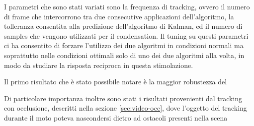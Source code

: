 I parametri che sono stati variati sono la frequenza di tracking, ovvero il numero di frame che intercorrono tra due consecutive applicazioni dell'algoritmo, la tolleranza consentita alla predizione dell'algoritmo di Kalman, ed il numero di samples che vengono utilizzati per il condensation. Il tuning su questi parametri ci ha consentito di forzare l'utilizzo dei due algoritmi in condizioni normali ma soprattutto nelle condizioni ottimali solo di uno dei due algoritmi alla volta, in modo da studiare la risposta reciproca in questa stimolazione.

Il primo risultato che è stato possibile notare è la maggior robustezza del 

Di particolare importanza inoltre sono stati i risultati provenienti dal tracking con occlusione, descritti nella sezione \ref{sec:video-occ}, dove l'oggetto del tracking durante il moto poteva nascondersi dietro ad ostacoli presenti nella scena





